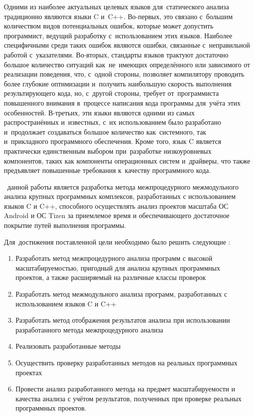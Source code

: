 Одними из наиболее актуальных целевых языков для~статического анализа традиционно являются языки C и~C++. Во-первых, это связано с~большим количеством видов потенциальных ошибок, которые может допустить программист, ведущий разработку с~использованием этих языков. Наиболее специфичными среди таких ошибок являются ошибки, связанные с~неправильной работой с~указателями. Во-вторых, стандарты языков трактуют достаточно большое количество ситуаций как~не~имеющих определённого или зависимого от реализации поведения, что, с~одной стороны, позволяет компилятору проводить более глубокие оптимизации и~получить наибольшую скорость выполнения результирующего кода, но, с~другой стороны, требует от~программиста повышенного внимания в~процессе написания кода программы для~учёта этих особенностей. В-третьих, эти языки являются одними из самых распространённых и~известных, с~их использованием было разработано и~продолжает создаваться большое количество как~системного, так и~прикладного программного обеспечения. Кроме того, язык C является практически единственным выбором при~разработке низкоуровневых компонентов, таких как компоненты операционных систем и~драйверы, что также предъявляет повышенные требования к~качеству программного кода.

 \aim\ данной работы является разработка метода межпроцедурного межмодульного анализа крупных программных комплексов, разработанных с использованием языков C и C++, способного осуществлять анализ проектов масштаба ОС Android и ОС Tizen за приемлемое время и обеспечивающего достаточное покрытие путей выполнения программы.

Для~достижения поставленной цели необходимо было решить следующие {\tasks}:
\begin{enumerate}
  \item Разработать метод межпроцедурного анализа программ с высокой масштабируемостью, пригодный для анализа крупных программных проектов, а также расширяемый на различные классы проверок
  \item Разработать метод межмодульного анализа программ, разработанных с использованием языков C и C++
  \item Разработать метод отображения результатов анализа при использовании разработанного метода межпроцедурного анализа
  \item Реализовать разработанные методы
  \item Осуществить проверку разработанных методов на реальных программных проектах
  \item Провести анализ разработанного метода на предмет масштабируемости и качества анализа с учётом результатов, полученных при проверке реальных программных проектов.
\end{enumerate}


